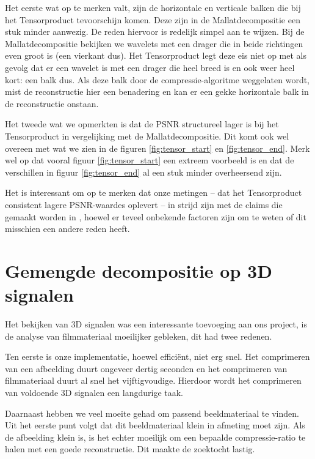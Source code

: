 Het eerste wat op te merken valt, zijn de horizontale en verticale balken die bij het Tensorproduct 
tevoorschijn komen. Deze zijn in de Mallatdecompositie een stuk minder aanwezig. De reden 
hiervoor is redelijk simpel aan te wijzen. Bij de Mallatdecompositie bekijken we wavelets met een 
drager die in beide richtingen even groot is (een vierkant dus). Het Tensorproduct legt deze eis 
niet op met als gevolg dat er een wavelet is met een drager die heel breed is en ook weer 
heel kort: een balk dus. Als deze balk door de compressie-algoritme weggelaten wordt, mist de 
reconstructie hier een benadering en kan er een gekke horizontale balk in de reconstructie onstaan.

Het tweede wat we opmerkten is dat de PSNR structureel lager is bij het Tensorproduct in vergelijking 
met de Mallatdecompositie. Dit komt ook wel overeen met wat we zien in de figuren \ref{fig:tensor_start} 
en \ref{fig:tensor_end}. Merk wel op dat vooral figuur \ref{fig:tensor_start} een extreem voorbeeld 
is en dat de verschillen in figuur \ref{fig:tensor_end} al een stuk minder overheersend zijn.

Het is interessant om op te merken dat onze metingen -- dat het Tensorproduct consistent lagere 
PSNR-waardes oplevert -- in strijd zijn met de claims die gemaakt worden in \cite{tensor_vs_mallat}, 
hoewel er teveel onbekende factoren zijn om te weten of dit misschien een andere reden heeft.

\section{Gemengde decompositie op 3D signalen}
Het bekijken van 3D signalen was een interessante toevoeging aan ons project, is de analyse  
van filmmateriaal moeilijker gebleken, dit had twee redenen.

Ten eerste is onze implementatie, hoewel effici\"ent, niet erg snel. Het comprimeren van een 
afbeelding duurt ongeveer dertig seconden en het comprimeren van filmmateriaal duurt al snel het 
vijftigvoudige. Hierdoor wordt het comprimeren van voldoende 3D signalen een langdurige taak.

Daarnaast hebben we veel moeite gehad om passend beeldmateriaal te vinden. Uit het eerste punt volgt 
dat dit beeldmateriaal klein in afmeting moet zijn. Als de afbeelding klein is, is het echter moeilijk
om een bepaalde compressie-ratio te halen met een goede reconstructie. Dit maakte de zoektocht lastig.

